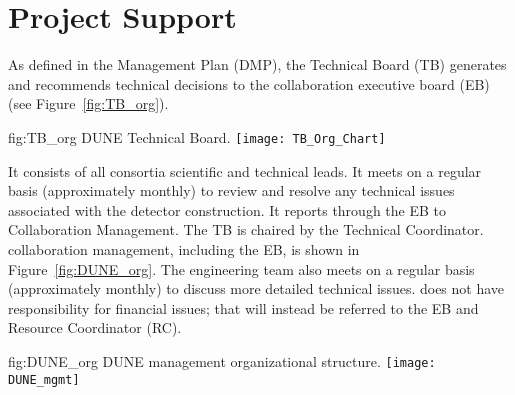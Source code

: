 \section{Project Support}
\label{sec:fdsp-coord-supp}

As defined in the  Management Plan (DMP), the 
Technical Board (TB) generates and recommends technical decisions to the 
collaboration executive board (EB) (see Figure~\ref{fig:TB_org}).
\begin{dunefigure}{fig:TB_org}
  {DUNE Technical Board.}
 \texttt{[image: TB\_Org\_Chart]}
\end{dunefigure}

It consists of all consortia scientific and technical leads. It meets
on a regular basis (approximately monthly) to review and resolve any
technical issues associated with the detector construction. It reports
through the EB to Collaboration Management. The  TB
is chaired by the Technical Coordinator.  collaboration
management, including the EB, is shown in Figure~\ref{fig:DUNE_org}. The
 engineering team also meets on a regular basis (approximately monthly)
to discuss more detailed technical issues.  does not have
responsibility for financial issues; that will instead be referred to
the EB and Resource Coordinator (RC).

\begin{dunefigure}{fig:DUNE_org}
  {DUNE management organizational structure.}
 \texttt{[image: DUNE\_mgmt]}
\end{dunefigure}

